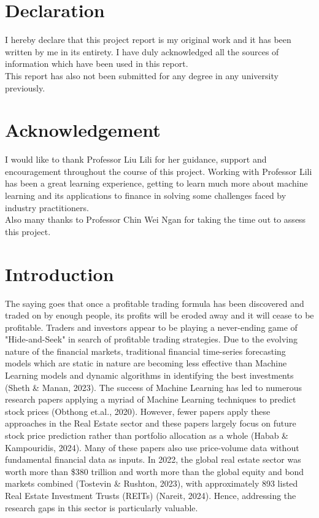 \documentclass[a4paper,12pt]{report}
\renewcommand\thechapter{\Roman{chapter}}
\numberwithin{equation}{section}
\theoremstyle{definition}
\begin{document}
\chapter*{Declaration}
\begin{center}{\large
I hereby declare that this project report is my original work and it has been written by me in its entirety. I have duly acknowledged all the sources of information which have been used in this report. \\[0.5in]
This report has also not been submitted for any degree in any university previously.
}

\chapter*{Acknowledgement}
{\large
I would like to thank Professor Liu Lili for her guidance, support and encouragement throughout the course of this project. Working with Professor Lili has been a great learning experience, getting to learn much more about machine learning and its applications to finance in solving some challenges faced by industry practitioners. \\[0.5in]
Also many thanks to Professor Chin Wei Ngan for taking the time out to assess this project.

}
\end{center}
\setcounter{secnumdepth}{3}
\setcounter{tocdepth}{3}


\tableofcontents


\setcounter{chapter}{1}
\renewcommand{\thechapter}{\arabic{chapter}}
\setcounter{chapter}{0}
\setcounter{page}{0}
\chapter{Introduction}
The saying goes that once a profitable trading formula has been discovered and traded on by enough people, its profits will be eroded away and it will cease to be profitable. Traders and investors appear to be playing a never-ending game of "Hide-and-Seek" in search of profitable trading strategies. Due to the evolving nature of the financial markets, traditional financial time-series forecasting models which are static in nature are becoming less effective than Machine Learning models and dynamic algorithms in identifying the best investments (Sheth \& Manan, 2023). The success of Machine Learning has led to numerous research papers applying a myriad of Machine Learning techniques to predict stock prices (Obthong et.al., 2020). However, fewer papers apply these approaches in the Real Estate sector and these papers largely focus on future stock price prediction rather than portfolio allocation as a whole (Habab \& Kampouridis, 2024). Many of these papers also use price-volume data without fundamental financial data as inputs. In 2022, the global real estate sector was worth more than \$380 trillion and worth more than the global equity and bond markets combined (Tostevin \& Rushton, 2023), with approximately 893 listed Real Estate Investment Trusts (REITs) (Nareit, 2024). Hence, addressing the research gaps in this sector is particularly valuable.
\end{document}
